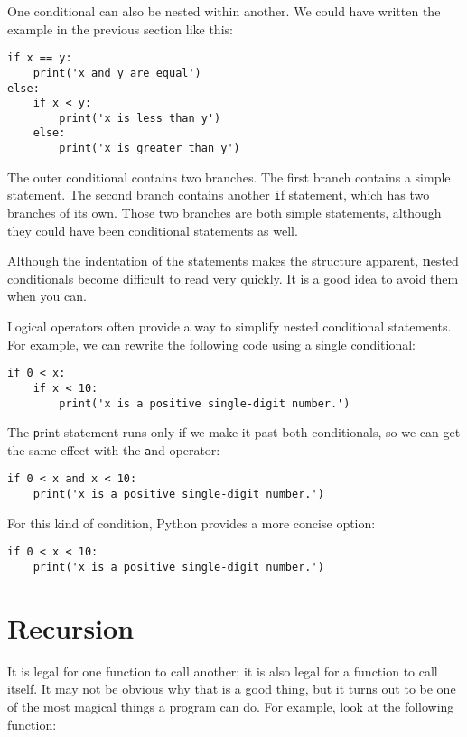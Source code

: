 \documentclass[
DIV=11,
fontsize=13,
twoside,
headinclude=false,
titlepage=firstiscover,
abstract=true,
headsepline=true,
footsepline=true,
chapterprefix=true, %
headings=big,
bibliography=totoc,%
captions=tableheading
]{scrbook}
\theoremstyle{definition}
\begin{document}
One conditional can also be nested within another.  We could have
written the example in the previous section like this:

\begin{lstlisting}
if x == y:
    print('x and y are equal')
else:
    if x < y:
        print('x is less than y')
    else:
        print('x is greater than y')
\end{lstlisting}
%
The outer conditional contains two branches.  The
first branch contains a simple statement.  The second branch
contains another {\texttt if} statement, which has two branches of its
own.  Those two branches are both simple statements,
although they could have been conditional statements as well.

Although the indentation of the statements makes the structure
apparent, {\textbf nested conditionals} become difficult to read very
quickly.  It is a good idea to avoid them when you can.

Logical operators often provide a way to simplify nested conditional
statements.  For example, we can rewrite the following code using a
single conditional:

\begin{lstlisting}
if 0 < x:
    if x < 10:
        print('x is a positive single-digit number.')
\end{lstlisting}
%
The {\texttt print} statement runs only if we make it past both
conditionals, so we can get the same effect with the {\texttt and} operator:

\begin{lstlisting}
if 0 < x and x < 10:
    print('x is a positive single-digit number.')
\end{lstlisting}

For this kind of condition, Python provides a more concise option:

\begin{lstlisting}
if 0 < x < 10:
    print('x is a positive single-digit number.')
\end{lstlisting}


\section{Recursion}
\label{recursion}

It is legal for one function to call another;
it is also legal for a function to call itself.  It may not be obvious
why that is a good thing, but it turns out to be one of the most
magical things a program can do.
For example, look at the following function:
\end{document}
